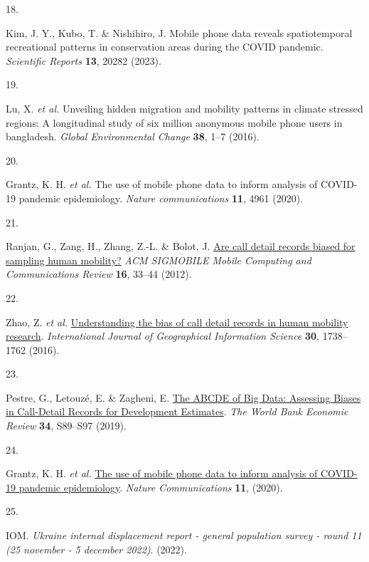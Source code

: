 \documentclass[
  11pt,
]{article}
\newlength{\cslhangindent}
\newlength{\csllabelwidth}
\newenvironment{CSLReferences}[2] %
 {\begin{list}{}{%
  \setlength{\itemindent}{0pt}
  \setlength{\leftmargin}{0pt}
  \setlength{\parsep}{0pt}
  \ifodd #1
   \setlength{\leftmargin}{\cslhangindent}
   \setlength{\itemindent}{-1\cslhangindent}
  \fi
  \setlength{\itemsep}{#2\baselineskip}}}
 {\end{list}}
\newcommand{\CSLLeftMargin}[1]{\parbox[t]{\csllabelwidth}{\strut#1\strut}}
\newcommand{\CSLRightInline}[1]{\parbox[t]{\linewidth - \csllabelwidth}{\strut#1\strut}}
\begin{document}
\begin{CSLReferences}{0}{0}
\CSLLeftMargin{18. }%
\CSLRightInline{Kim, J. Y., Kubo, T. \& Nishihiro, J. Mobile phone data
reveals spatiotemporal recreational patterns in conservation areas
during the COVID pandemic. \emph{Scientific Reports} \textbf{13}, 20282
(2023).}

\CSLLeftMargin{19. }%
\CSLRightInline{Lu, X. \emph{et al.} Unveiling hidden migration and
mobility patterns in climate stressed regions: A longitudinal study of
six million anonymous mobile phone users in bangladesh. \emph{Global
Environmental Change} \textbf{38}, 1--7 (2016).}

\CSLLeftMargin{20. }%
\CSLRightInline{Grantz, K. H. \emph{et al.} The use of mobile phone data
to inform analysis of COVID-19 pandemic epidemiology. \emph{Nature
communications} \textbf{11}, 4961 (2020).}

\CSLLeftMargin{21. }%
\CSLRightInline{Ranjan, G., Zang, H., Zhang, Z.-L. \& Bolot, J.
\href{https://doi.org/10.1145/2412096.2412101}{Are call detail records
biased for sampling human mobility?} \emph{ACM SIGMOBILE Mobile
Computing and Communications Review} \textbf{16}, 33--44 (2012).}

\CSLLeftMargin{22. }%
\CSLRightInline{Zhao, Z. \emph{et al.}
\href{https://doi.org/10.1080/13658816.2015.1137298}{Understanding the
bias of call detail records in human mobility research}.
\emph{International Journal of Geographical Information Science}
\textbf{30}, 1738--1762 (2016).}

\CSLLeftMargin{23. }%
\CSLRightInline{Pestre, G., Letouzé, E. \& Zagheni, E.
\href{https://doi.org/10.1093/wber/lhz039}{The ABCDE of Big Data:
Assessing Biases in Call-Detail Records for Development Estimates}.
\emph{The World Bank Economic Review} \textbf{34}, S89--S97 (2019).}

\CSLLeftMargin{24. }%
\CSLRightInline{Grantz, K. H. \emph{et al.}
\href{https://doi.org/10.1038/s41467-020-18190-5}{The use of mobile
phone data to inform analysis of COVID-19 pandemic epidemiology}.
\emph{Nature Communications} \textbf{11}, (2020).}

\CSLLeftMargin{25. }%
\CSLRightInline{IOM. \emph{Ukraine internal displacement report -
general population survey - round 11 (25 november - 5 december 2022)}.
(2022).}


\end{CSLReferences}
\end{document}
